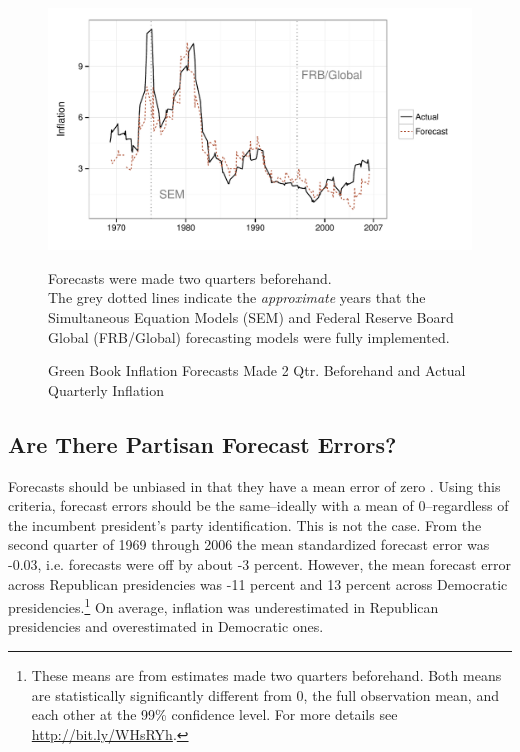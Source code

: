 \documentclass[a4paper]{article}\usepackage{graphicx, color}
\newenvironment{knitrout}{}{} %
\begin{document}
\begin{figure}[t]
    \caption{Green Book Inflation Forecasts Made 2 Qtr. Beforehand and Actual Quarterly Inflation}
    \label{absolute}
    \begin{center}
    
\begin{knitrout}
\color{fgcolor}\includegraphics[width=0.8\linewidth]{figure/BaseInflation} 
\end{knitrout}

    
    \end{center}
    \begin{singlespace}
        {\scriptsize{Forecasts were made two quarters beforehand. \\
                     The grey dotted lines indicate the {\emph{approximate}} years that the Simultaneous Equation Models (SEM) and Federal Reserve Board Global (FRB/Global) forecasting models were fully implemented.  
                      }}
    \end{singlespace}
\end{figure}


\subsection{Are There Partisan Forecast Errors?}




Forecasts should be unbiased in that they have a mean error of zero \citep[5]{Bruck2006}. Using this criteria, forecast errors should be the same--ideally with a mean of 0--regardless of the incumbent president's party identification. This is not the case. From the second quarter of 1969 through 2006 the mean standardized forecast error was -0.03, i.e. forecasts were off by about -3 percent. However, the mean  forecast error across Republican presidencies was -11 percent and 13 percent across Democratic presidencies.\footnote{These means are from estimates made two quarters beforehand. Both means are statistically significantly different from 0, the full observation mean, and each other at the 99\% confidence level. For more details see \url{http://bit.ly/WHsRYh}.} On average, inflation was underestimated in Republican presidencies and overestimated in Democratic ones.
\end{document}

